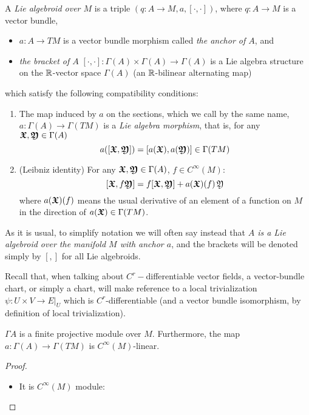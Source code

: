 \begin{definition} \label{defnLieAlgoid}
A \emph{Lie algebroid over $M$} is a triple $(q:A \to M, a, [\cdot, \cdot ])$, where $q:A \to M$ is a vector bundle, 
    \begin{itemize}
    \item $a:A \to TM$ is a vector bundle morphism called \emph{the anchor of $A$}, and
    \item \emph{the bracket of $A$} $[\cdot, \cdot ]: \Gamma(A) \times \Gamma(A) \to \Gamma(A)$ is a Lie algebra structure on the $\mathbb{R}$-vector space $\Gamma(A)$ (an $\mathbb{R}$-bilinear alternating map) 
    \end{itemize}  which satisfy the following compatibility conditions:

\begin{enumerate}
    \item The map induced by $a$ on the sections, which we call by the same name, $a:\Gamma(A) \to \Gamma(TM)$ is a \emph{Lie algebra morphism}, that is, for any $\bm{\mathfrak{X}}, \bm{\mathfrak{Y}} \in \Gamma(A)$ \[ a([\bm{\mathfrak{X}}, \bm{\mathfrak{Y}}])  = [a(\bm{\mathfrak{X}}), a(\bm{\mathfrak{Y}})] \in  \Gamma(TM)\]
    
    \item (Leibniz identity) For any $\bm{\mathfrak{X}}, \bm{\mathfrak{Y}} \in \Gamma(A)$, $f \in C^\infty (M)$: \[ [\bm{\mathfrak{X}}, f\bm{\mathfrak{Y}}] = f[\bm{\mathfrak{X}}, \bm{\mathfrak{Y}}] + a(\bm{\mathfrak{X}})(f)\, \mathfrak{Y} \] where $a(\bm{\mathfrak{X}})(f)$ means the usual derivative of an element of a function on $M$ in the direction of $a(\bm{\mathfrak{X}}) \in \Gamma(TM)$.
\end{enumerate}
\end{definition}

As it is usual, to simplify notation we will often say instead that \emph{$A$ is a Lie algebroid over the manifold $M$ with anchor $a$}, and the brackets will be denoted simply by $[,]$ for all Lie algebroids.

Recall that, when talking about $C^r-$differentiable vector fields, a vector-bundle chart, or simply a chart, will make reference to a local trivialization $\psi: U \times V \to E|_U$ which is $C^r$-differentiable (and a vector bundle isomorphism, by definition of local trivialization).


\begin{proposition}
$\Gamma A$ is a finite projective module over $M$. Furthermore, the map $a: \Gamma(A) \to \Gamma(TM)$ is $C^\infty(M)$-linear.
\end{proposition}
\begin{proof}
    \begin{itemize}
    \item It is $C^\infty(M)$ module:
    \end{itemize}
\end{proof}

